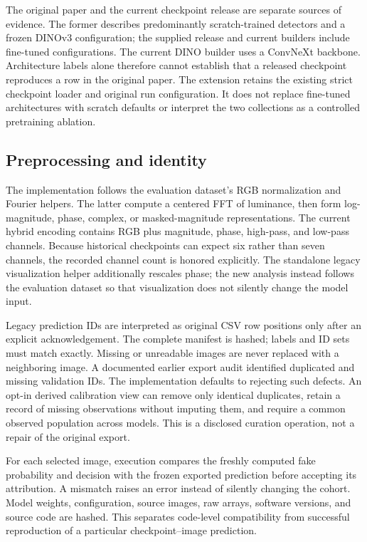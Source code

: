 \documentclass{article}
\begin{document}
The original paper and the current checkpoint release are separate sources of evidence. The former describes predominantly scratch-trained detectors and a frozen DINOv3 configuration; the supplied release and current builders include fine-tuned configurations. The current DINO builder uses a ConvNeXt backbone. Architecture labels alone therefore cannot establish that a released checkpoint reproduces a row in the original paper. The extension retains the existing strict checkpoint loader and original run configuration. It does not replace fine-tuned architectures with scratch defaults or interpret the two collections as a controlled pretraining ablation.

\subsection{Preprocessing and identity}
The implementation follows the evaluation dataset's RGB normalization and Fourier helpers. The latter compute a centered FFT of luminance, then form log-magnitude, phase, complex, or masked-magnitude representations. The current hybrid encoding contains RGB plus magnitude, phase, high-pass, and low-pass channels. Because historical checkpoints can expect six rather than seven channels, the recorded channel count is honored explicitly. The standalone legacy visualization helper additionally rescales phase; the new analysis instead follows the evaluation dataset so that visualization does not silently change the model input.

Legacy prediction IDs are interpreted as original CSV row positions only after an explicit acknowledgement. The complete manifest is hashed; labels and ID sets must match exactly. Missing or unreadable images are never replaced with a neighboring image. A documented earlier export audit identified duplicated and missing validation IDs. The implementation defaults to rejecting such defects. An opt-in derived calibration view can remove only identical duplicates, retain a record of missing observations without imputing them, and require a common observed population across models. This is a disclosed curation operation, not a repair of the original export.

For each selected image, execution compares the freshly computed fake probability and decision with the frozen exported prediction before accepting its attribution. A mismatch raises an error instead of silently changing the cohort. Model weights, configuration, source images, raw arrays, software versions, and source code are hashed. This separates code-level compatibility from successful reproduction of a particular checkpoint--image prediction.
\end{document}
